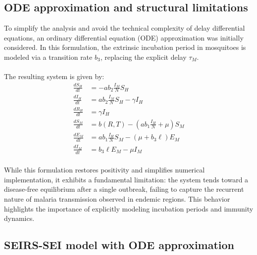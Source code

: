\documentclass[a4paper,fleqn]{cas-dc}
\begin{document}
\subsection{ODE approximation and structural limitations}
\label{sec:ode_approximation_limitations}

To simplify the analysis and avoid the technical complexity of delay differential equations, an ordinary differential equation (ODE) 
approximation was initially considered. In this formulation, the extrinsic incubation period in mosquitoes is modeled via a transition 
rate $b_3$, replacing the explicit delay $\tau_M$. 
\\\\
The resulting system is given by:
\begin{subequations}\label{eq:system}
\begin{align}
\frac{dS_H}{dt} &= - a b_2 \frac{I_M}{N} S_H \label{eq:systema} \\
\frac{dI_H}{dt} &= a b_2 \frac{I_M}{N} S_H - \gamma I_H \label{eq:systemb} \\
\frac{dR_H}{dt} &= \gamma I_H \label{eq:systemc} \\
\frac{dS_M}{dt} &= b(R,T) - \left(a b_1 \frac{I_H}{N} + \mu\right) S_M \label{eq:systemd} \\
\frac{dE_M}{dt} &= a b_1 \frac{I_H}{N} S_M - (\mu + b_3 \ell) E_M \label{eq:systeme} \\
\frac{dI_M}{dt} &= b_3 \ell E_M - \mu I_M \label{eq:systemf}
\end{align}
\end{subequations}
\\
While this formulation restores positivity and simplifies numerical implementation, it exhibits a 
fundamental limitation: the system tends toward a disease-free equilibrium after a single outbreak, failing to 
capture the recurrent nature of malaria transmission observed in endemic regions. This behavior highlights the 
importance of explicitly modeling incubation periods and immunity dynamics.

\subsection{SEIRS-SEI model with ODE approximation}
\label{sec:seirs_sei_model_ode_approximation}
\end{document}
